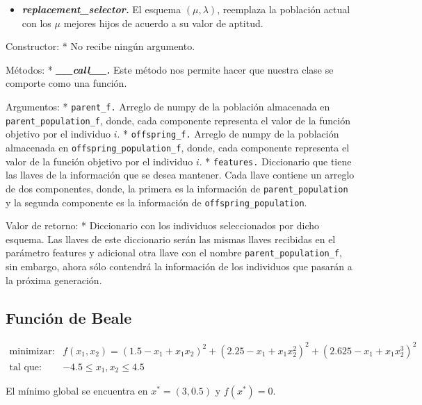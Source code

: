 \documentclass[11pt]{article}
\providecommand{\tightlist}{%
      \setlength{\itemsep}{0pt}\setlength{\parskip}{0pt}}
\begin{document}
\begin{itemize}
\tightlist
\item
  \emph{\textbf{replacement\_selector.}} El esquema \((\mu, \lambda)\),
  reemplaza la población actual con los \(\mu\) mejores hijos de acuerdo
  a su valor de aptitud.
\end{itemize}

Constructor: * No recibe ningún argumento.

Métodos: * \emph{\textbf{\_\_call\_\_.}} Este método nos permite hacer
que nuestra clase se comporte como una función.

Argumentos: * \texttt{parent\_f.} Arreglo de numpy de la población
almacenada en \texttt{parent\_population\_f}, donde, cada componente
representa el valor de la función objetivo por el individuo \(i\). *
\texttt{offspring\_f.} Arreglo de numpy de la población almacenada en
\texttt{offspring\_population\_f}, donde, cada componente representa el
valor de la función objetivo por el individuo \(i\). *
\texttt{features.} Diccionario que tiene las llaves de la información
que se desea mantener. Cada llave contiene un arreglo de dos
componentes, donde, la primera es la información de
\texttt{parent\_population} y la segunda componente es la información de
\texttt{offspring\_population}.

Valor de retorno: * Diccionario con los individuos seleccionados por
dicho esquema. Las llaves de este diccionario serán las mismas llaves
recibidas en el parámetro features y adicional otra llave con el nombre
\texttt{parent\_population\_f}, sin embargo, ahora sólo contendrá la
información de los individuos que pasarán a la próxima generación.

    \subsection{Función de Beale}\label{funciuxf3n-de-beale}

\begin{equation}
  \label{eq:BF}
  \begin{array}{rll}
  \text{minimizar:} & f(x_1, x_2) = (1.5 - x_1 + x_1x_2)^2 + (2.25 - x_1 + x_1x_2^2)^2 + (2.625 - x_1 + x_1x_2^3)^2
  &  \\
  \text{tal que: } & -4.5 \leq x_1,x_2 \leq 4.5 &  
  \end{array}
\end{equation}

El mínimo global se encuentra en \(x^* = (3, 0.5)\) y \(f(x^*) = 0\).
\end{document}
